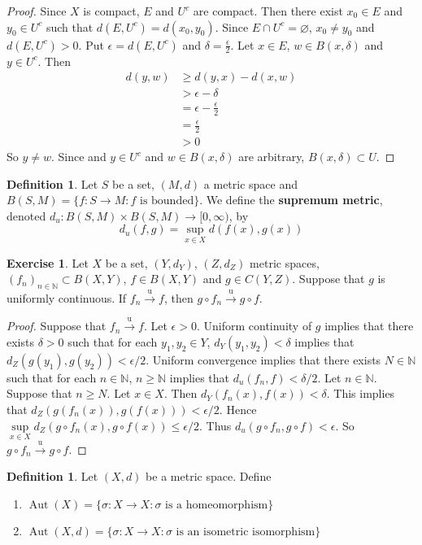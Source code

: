 \documentclass[12pt]{amsart}
\theoremstyle{definition}
\newtheorem{defn}[definition]{Definition}
\newtheorem{ex}[definition]{Exercise}
\newcommand{\del}{\delta}
\newcommand{\ep}{\epsilon}
\newcommand{\sig}{\sigma}
\newcommand{\N}{\mathbb{N}}
\newcommand{\Rg}{[0,\infty)}
\newcommand{\convt}[1]{\xrightarrow{\text{#1}}}
\DeclareMathOperator{\Aut}{Aut}
\newcommand{\lex}[1]{\label{ex:#1}}
\newcommand{\ld}[1]{\label{defn:#1}}
\begin{document}
	\begin{proof}
	Since $X$ is compact, $E$ and $U^c$ are compact. Then there exist $x_0 \in E$ and $y_0 \in U^c$ such that $d(E, U^c) = d(x_0,y_0)$. Since $E \cap U^c = \varnothing$, $x_0 \neq y_0$ and $d(E, U^c) >0$. Put $\ep = d(E, U^c)$ and $\del = \frac{\ep}{2}$.  Let $x \in E$, $w \in B(x, \del)$ and $y \in U^c$. Then 
	\begin{align*}
	d(y, w) 
	&\geq d(y, x) - d(x, w) \\
	&> \ep - \del \\
	&= \ep - \frac{\ep}{2} \\
	&= \frac{\ep}{2} \\
	&> 0
\end{align*}	  
	So $y \neq w$. Since and $y \in U^c$ and $w \in B(x, \del)$ are arbitrary, $B(x, \del) \subset U$.
	\end{proof}
	
	\begin{defn} \ld{}
	Let $S$ be a set, $(M, d)$ a metric space and $B(S, M) = \{f: S \rightarrow M: f \text{ is bounded} \}$. We define the \textbf{supremum metric}, denoted $d_u:B(S,M) \times B(S,M) \rightarrow \Rg$, by $$d_u(f, g) = \sup_{x \in X}d(f(x), g(x)) $$ 
	\end{defn}
	
	\begin{ex} \lex{211111111}
	Let $X$ be a set, $(Y, d_Y)$, $(Z, d_Z)$ metric spaces, $(f_n)_{n \in \N} \subset B(X, Y)$, $f \in B(X, Y)$ and $g \in C(Y, Z)$. Suppose that $g$ is uniformly continuous. If $f_n \convt{u} f$, then $g \circ f_n \convt{u} g \circ f$. 
	\end{ex}
	
	\begin{proof}
	Suppose that $f_n \convt{u} f$. Let $\ep >0$. Uniform continuity of $g$ implies that there exists $\del >0$ such that for each $y_1, y_2 \in Y$, $d_Y(y_1, y_2) < \del$ implies that $d_Z(g(y_1), g(y_2)) < \ep/2$.  Uniform convergence implies that there exists $N \in \N$ such that for each $n \in \N$, $n \geq \N$ implies that $d_u(f_n, f) < \del/2$. Let $n \in \N$. Suppose that $n \geq N$. Let $x \in X$. Then $d_Y(f_n(x), f(x)) < \del$. This implies that $d_Z(g(f_n(x)), g(f(x))) < \ep/2$. Hence $\sup\limits_{x \in X} d_Z(g \circ f_n(x), g \circ f(x)) \leq \ep/2$. Thus $d_u(g \circ f_n , g \circ f) < \ep$. So $g \circ f_n \convt{u} g \circ f$.
	\end{proof}
	
	\begin{defn} \ld{}
	Let $(X, d)$ be a metric space. Define
	\begin{enumerate}
	\item $\Aut(X) = \{\sig:X \rightarrow X: \sig \text{ is a homeomorphism}\}$
	\item $\Aut(X, d) = \{\sig:X \rightarrow X: \sig \text{ is an isometric isomorphism}\}$
	\end{enumerate}
	\end{defn}
	
\end{document}
